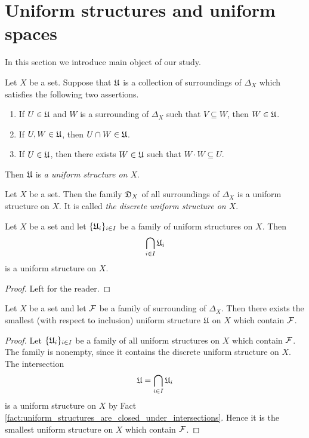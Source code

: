\section{Uniform structures and uniform spaces}
\noindent
In this section we introduce main object of our study.

\begin{definition}
Let $X$ be a set. Suppose that ${\mathfrak U}$ is a collection of surroundings of $\Delta_X$ which satisfies the following two assertions.
\begin{enumerate}[label=\textbf{(\arabic*)}, leftmargin=*]
\item If $U \in {\mathfrak U}$ and $W$ is a surrounding of $\Delta_X$ such that $V\subseteq W$, then $W\in {\mathfrak U}$.
\item If $U,W\in {\mathfrak U}$, then $U\cap W \in {\mathfrak U}$. 
\item If $U \in {\mathfrak U}$, then there exists $W\in {\mathfrak U}$ such that $W\cdot W \subseteq U$.
\end{enumerate}
Then ${\mathfrak U}$ is \textit{a uniform structure on $X$}.
\end{definition}

\begin{example}\label{example:discrete_uniform_structure}
Let $X$ be a set. Then the family ${\mathfrak D}_X$ of all surroundings of $\Delta_X$ is a uniform structure on $X$. It is called \textit{the discrete uniform structure on $X$}.
\end{example}

\begin{fact}\label{fact:uniform_structures_are_closed_under_intersections}
Let $X$ be a set and let $\{{\mathfrak U}_i\}_{i\in I}$ be a family of uniform structures on $X$. Then 
$$\bigcap_{i\in I}{\mathfrak U}_i$$
is a uniform structure on $X$.
\end{fact}
\begin{proof}
Left for the reader.
\end{proof}

\begin{corollary}\label{corollary:smallest_uniform_structure_containing_given_family_of_surroundings}
Let $X$ be a set and let ${\mathcal F}$ be a family of surrounding of $\Delta_X$. Then there exists the smallest (with respect to inclusion) uniform structure ${\mathfrak U}$ on $X$ which contain ${\mathcal F}$.
\end{corollary}
\begin{proof}
Let $\{{\mathfrak U}_i\}_{i\in I}$ be a family of all uniform structures on $X$ which contain ${\mathcal F}$. The family is nonempty, since it contains the discrete uniform structure on $X$. The intersection $${\mathfrak U} = \bigcap_{i\in I}{\mathfrak U}_i$$
is a uniform structure on $X$ by Fact \ref{fact:uniform_structures_are_closed_under_intersections}. Hence it is the smallest uniform structure on $X$ which contain ${\mathcal F}$.
\end{proof}

